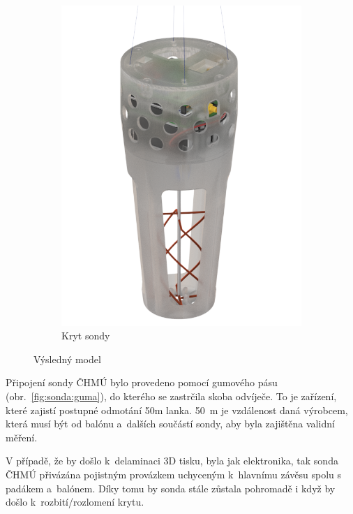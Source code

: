 \documentclass[twoside]{ctuthesis}
\theoremstyle{plain}
\theoremstyle{definition}
\theoremstyle{note}
\begin{document}
\begin{figure}[hbtp]
\begin{subfigure}{.49\textwidth}
			\includegraphics[width = .85\textwidth]{Figures/sonda_case.png}
			\caption{Kryt sondy}
			\label{fig:sondacase}
		\end{subfigure}
		\caption{Výsledný model}
		\label{fig:sonda:final}
	\end{figure}


	Připojení sondy ČHMÚ bylo provedeno pomocí gumového pásu (obr.~\ref{fig:sonda:guma}), do kterého se zastrčila skoba odvíječe. To je zařízení, které zajistí postupné odmotání 50m lanka. 50~m je vzdálenost daná výrobcem, která musí být od balónu a~dalších součástí sondy, aby byla zajištěna validní měření.

	

	V případě, že by došlo k~delaminaci 3D tisku, byla jak elektronika, tak sonda ČHMÚ přivázána pojistným provázkem uchyceným k~hlavnímu závěsu spolu s padákem a~balónem. Díky tomu by sonda stále zůstala pohromadě i když by došlo k~rozbití/rozlomení krytu.

\end{document}
